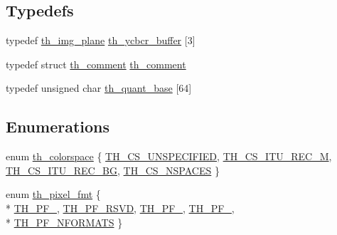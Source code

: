 \subsection*{Typedefs}
\begin{DoxyCompactItemize}
\item 
typedef \hyperlink{structth__img__plane}{th\+\_\+img\+\_\+plane} \hyperlink{theora_2libtheora-1_81_81_2include_2theora_2codec_8h_a343f7cfabad179cc4fe527cf06873f45}{th\+\_\+ycbcr\+\_\+buffer} \mbox{[}3\mbox{]}
\item 
typedef struct \hyperlink{structth__comment}{th\+\_\+comment} \hyperlink{theora_2libtheora-1_81_81_2include_2theora_2codec_8h_a96239eba5d663e3d9ccb40031b2dcfe4}{th\+\_\+comment}
\item 
typedef unsigned char \hyperlink{theora_2libtheora-1_81_81_2include_2theora_2codec_8h_a6a1426d16beef8a311d7f0e9d2e96326}{th\+\_\+quant\+\_\+base} \mbox{[}64\mbox{]}
\end{DoxyCompactItemize}
\subsection*{Enumerations}
\begin{DoxyCompactItemize}
\item 
enum \hyperlink{theora_2libtheora-1_81_81_2include_2theora_2codec_8h_a4ce7a695ce353b1582d29b6c1ddf31a0}{th\+\_\+colorspace} \{ \hyperlink{theora_2libtheora-1_81_81_2include_2theora_2codec_8h_a4ce7a695ce353b1582d29b6c1ddf31a0adb9a17a3283c8d490652e507db2427cf}{T\+H\+\_\+\+C\+S\+\_\+\+U\+N\+S\+P\+E\+C\+I\+F\+I\+E\+D}, 
\hyperlink{theora_2libtheora-1_81_81_2include_2theora_2codec_8h_a4ce7a695ce353b1582d29b6c1ddf31a0a1a19346bbfb8192baa4c185df73d3397}{T\+H\+\_\+\+C\+S\+\_\+\+I\+T\+U\+\_\+\+R\+E\+C\+\_\+M}, 
\hyperlink{theora_2libtheora-1_81_81_2include_2theora_2codec_8h_a4ce7a695ce353b1582d29b6c1ddf31a0a009021d50836ddb0ec6004a2803775fe}{T\+H\+\_\+\+C\+S\+\_\+\+I\+T\+U\+\_\+\+R\+E\+C\+\_\+B\+G}, 
\hyperlink{theora_2libtheora-1_81_81_2include_2theora_2codec_8h_a4ce7a695ce353b1582d29b6c1ddf31a0a0fa8ea07f583ee57943520ddb2f6e62e}{T\+H\+\_\+\+C\+S\+\_\+\+N\+S\+P\+A\+C\+E\+S}
 \}
\item 
enum \hyperlink{theora_2libtheora-1_81_81_2include_2theora_2codec_8h_a5c9e7f2f0c7ed209c9ca3ed0abd328bc}{th\+\_\+pixel\+\_\+fmt} \{ \\*
\hyperlink{theora_2libtheora-1_81_81_2include_2theora_2codec_8h_a5c9e7f2f0c7ed209c9ca3ed0abd328bcafed7ad7ee4345930255827bff6055162}{T\+H\+\_\+\+P\+F\+\_}, 
\hyperlink{theora_2libtheora-1_81_81_2include_2theora_2codec_8h_a5c9e7f2f0c7ed209c9ca3ed0abd328bca9e60af0159d42b20806d7eb4a8b833e6}{T\+H\+\_\+\+P\+F\+\_\+\+R\+S\+V\+D}, 
\hyperlink{theora_2libtheora-1_81_81_2include_2theora_2codec_8h_a5c9e7f2f0c7ed209c9ca3ed0abd328bca0271d01babf2f51512479f4a6245b9fa}{T\+H\+\_\+\+P\+F\+\_}, 
\hyperlink{theora_2libtheora-1_81_81_2include_2theora_2codec_8h_a5c9e7f2f0c7ed209c9ca3ed0abd328bca2ac50ac048ea75501a5e0f99a63c8c86}{T\+H\+\_\+\+P\+F\+\_}, 
\\*
\hyperlink{theora_2libtheora-1_81_81_2include_2theora_2codec_8h_a5c9e7f2f0c7ed209c9ca3ed0abd328bca2d6d78b9df1df086bb60f32f963a31eb}{T\+H\+\_\+\+P\+F\+\_\+\+N\+F\+O\+R\+M\+A\+T\+S}
 \}
\end{DoxyCompactItemize}
